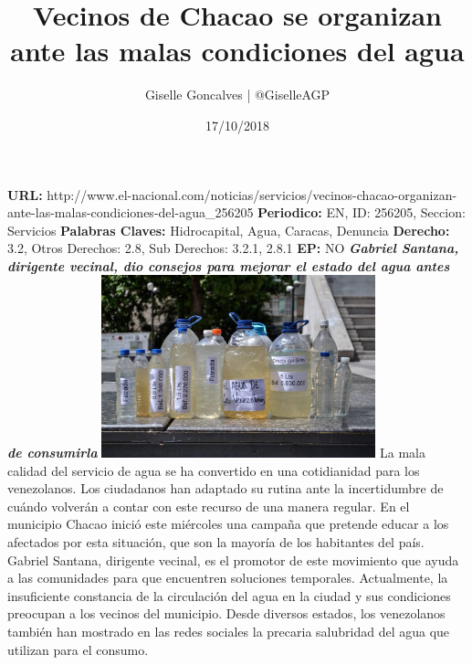 \documentclass{article}%
\title{\textbf{Vecinos de Chacao se organizan ante las malas condiciones del agua}}%
\author{Giselle Goncalves | @GiselleAGP}%
\date{17/10/2018}%
\begin{document}
%
\normalsize%
\maketitle%
\textbf{URL: }%
http://www.el{-}nacional.com/noticias/servicios/vecinos{-}chacao{-}organizan{-}ante{-}las{-}malas{-}condiciones{-}del{-}agua\_256205\newline%
%
\textbf{Periodico: }%
EN, %
ID: %
256205, %
Seccion: %
Servicios\newline%
%
\textbf{Palabras Claves: }%
Hidrocapital, Agua, Caracas, Denuncia\newline%
%
\textbf{Derecho: }%
3.2, %
Otros Derechos: %
2.8, %
Sub Derechos: %
3.2.1, 2.8.1\newline%
%
\textbf{EP: }%
NO\newline%
\newline%
%
\textbf{\textit{Gabriel Santana, dirigente vecinal, dio consejos para mejorar el estado del agua antes de consumirla}}%
\newline%
\newline%
%
\includegraphics[width=300px]{54.jpg}%
\newline%
%
La mala calidad del servicio de agua se ha convertido en una cotidianidad para los venezolanos. Los ciudadanos han adaptado su rutina ante la incertidumbre de cuándo volverán a contar con este recurso de una manera regular.%
\newline%
%
En el municipio Chacao inició este miércoles una campaña que pretende educar a los afectados por esta situación, que son la mayoría de los habitantes del país. Gabriel Santana, dirigente vecinal, es el promotor de este movimiento que ayuda a las comunidades para que encuentren soluciones temporales.%
\newline%
%
Actualmente, la insuficiente constancia de la circulación del agua en la ciudad y sus condiciones preocupan a los vecinos del municipio. Desde diversos estados, los venezolanos también han mostrado en las redes sociales la precaria salubridad del agua que utilizan para el consumo.%
\end{document}
